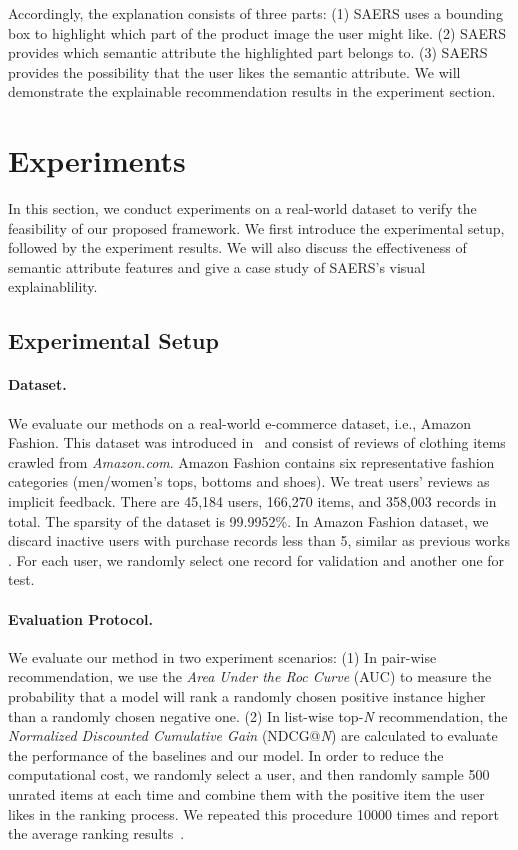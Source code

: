 \documentclass{article}
\begin{document}
Accordingly, the explanation consists of three parts: 
(1) SAERS uses a bounding box to highlight which part of the product image the user might like. 
(2) SAERS provides which semantic attribute the highlighted part belongs to. 
(3) SAERS provides the possibility that the user likes the semantic attribute. We will demonstrate the explainable recommendation results in the experiment section.



\section{Experiments}
In this section, we conduct experiments on a real-world dataset to verify the feasibility of our proposed framework. We first introduce the experimental setup, followed by the experiment results. We will also discuss the effectiveness of semantic attribute features and give a case study of SAERS's visual explainablility.


\subsection{Experimental Setup}

\paragraph{Dataset.} We evaluate our methods on a real-world e-commerce dataset, i.e., Amazon Fashion. This dataset was introduced in~\cite{he2016vbpr,kang2017visually} and consist of reviews of clothing items crawled from \textit{Amazon.com}. Amazon Fashion contains six representative fashion categories (men/women's tops, bottoms and shoes). We treat users' reviews as implicit feedback. There are 45,184 users, 166,270 items, and 358,003 records in total. The sparsity of the dataset is 99.9952\%. In Amazon Fashion dataset, we discard inactive users with purchase records less than 5, similar as previous works \cite{he2016vbpr,kang2017visually}. For each user, we randomly select one record for validation and another one for test. 
\paragraph{Evaluation Protocol.} We evaluate our method in two experiment scenarios: 
(1) In pair-wise recommendation, we use the \textit{Area Under the Roc Curve} (AUC) \cite{rendle2009bpr} to measure the probability that a model will rank a randomly chosen positive instance higher than a randomly chosen negative one.
(2) In list-wise top-\textit{N} recommendation, the \textit{Normalized Discounted Cumulative Gain} (NDCG@\textit{N}) are calculated to evaluate the performance of the baselines and our model. In order to reduce the computational cost, we randomly select a user, and then randomly sample 500 unrated items at each time and combine them with the positive item the user likes in the ranking process. We repeated this procedure 10000 times and report the average ranking results~\cite{wu2017modeling}.
\end{document}
